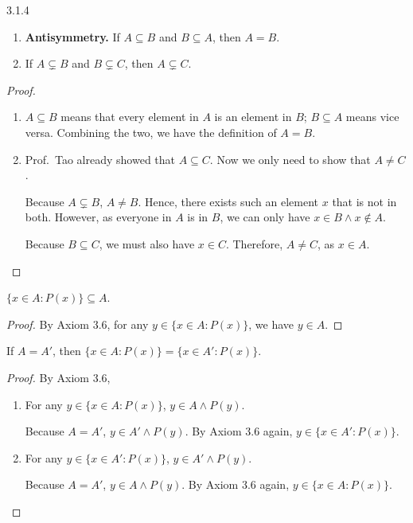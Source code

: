 \begin{exercise}{3.1.4}
	\begin{enumerate}
		\item {\bf Antisymmetry.} If $A \subseteq B$ and $B \subseteq A$, then $A = B$. 
		\item If $A \subsetneq B$ and $B \subsetneq C$, then $A \subsetneq C$.
	\end{enumerate}
\end{exercise}
\begin{proof}\leavevmode
	\begin{enumerate}
		\item $A \subseteq B$ means that every element in $A$ is an element in $B$; $B \subseteq A$ means vice versa. Combining the two, we have the definition of $A = B$.		
		\item Prof.~Tao already showed that $A \subseteq C$. Now we only need to show that $A \ne C$. 
		
		Because $A \subsetneq B$, $A \ne B$. Hence, there exists such an element $x$ that is not in both. However, as everyone in $A$ is in $B$, we can only have $x \in B \wedge x \notin A$.
		
		Because $B \subseteq C$, we must also have $x \in C$. Therefore, $A \ne C$, as $x \in A$.
	\end{enumerate}
\end{proof}

\begin{why}{33}
	$\{x \in A : P(x)\} \subseteq A$.
\end{why}
\begin{proof}
	By Axiom 3.6, for any $y \in \{x \in A : P(x)\}$, we have $y \in A$.
\end{proof}
\begin{why}{33}
	If $A = A'$, then $\{x \in A : P(x)\} = \{x \in A' : P(x)\}$.
\end{why}
\begin{proof}
	By Axiom 3.6,
	\begin{enumerate}
		\item For any $y \in \{x \in A : P(x)\}$, $y \in A \wedge P(y)$. 
		
		Because $A = A'$, $y \in A' \wedge P(y)$. By Axiom 3.6 again, $y \in \{x \in A' : P(x)\}$.
		\item For any $y \in \{x \in A' : P(x)\}$, $y \in A' \wedge P(y)$. 
		
		Because $A = A'$, $y \in A \wedge P(y)$. By Axiom 3.6 again, $y \in \{x \in A : P(x)\}$.
	\end{enumerate}
\end{proof}

